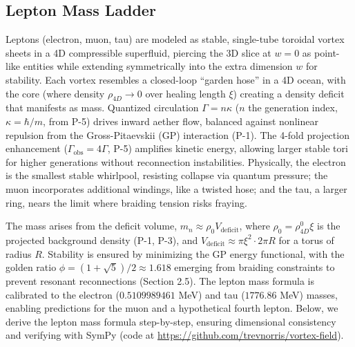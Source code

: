 \medskip
{}

\subsection{Lepton Mass Ladder}

Leptons (electron, muon, tau) are modeled as stable, single-tube toroidal vortex sheets in a 4D compressible superfluid, piercing the 3D slice at $w=0$ as point-like entities while extending symmetrically into the extra dimension $w$ for stability. Each vortex resembles a closed-loop ``garden hose'' in a 4D ocean, with the core (where density $\rho_{4D} \to 0$ over healing length $\xi$) creating a density deficit that manifests as mass. Quantized circulation $\Gamma = n \kappa$ ($n$ the generation index, $\kappa = \hbar / m$, from P-5) drives inward aether flow, balanced against nonlinear repulsion from the Gross-Pitaevskii (GP) interaction (P-1). The 4-fold projection enhancement ($\Gamma_{\text{obs}} = 4\Gamma$, P-5) amplifies kinetic energy, allowing larger stable tori for higher generations without reconnection instabilities. Physically, the electron is the smallest stable whirlpool, resisting collapse via quantum pressure; the muon incorporates additional windings, like a twisted hose; and the tau, a larger ring, nears the limit where braiding tension risks fraying.

The mass arises from the deficit volume, $m_n \approx \rho_0 V_{\text{deficit}}$, where $\rho_0 = \rho_{4D}^0 \xi$ is the projected background density (P-1, P-3), and $V_{\text{deficit}} \approx \pi \xi^2 \cdot 2\pi R$ for a torus of radius $R$. Stability is ensured by minimizing the GP energy functional, with the golden ratio $\phi = (1 + \sqrt{5})/2 \approx 1.618$ emerging from braiding constraints to prevent resonant reconnections (Section 2.5). The lepton mass formula is calibrated to the electron ($0.5109989461$ MeV) and tau ($1776.86$ MeV) masses, enabling predictions for the muon and a hypothetical fourth lepton. Below, we derive the lepton mass formula step-by-step, ensuring dimensional consistency and verifying with SymPy (code at \url{https://github.com/trevnorris/vortex-field}).

